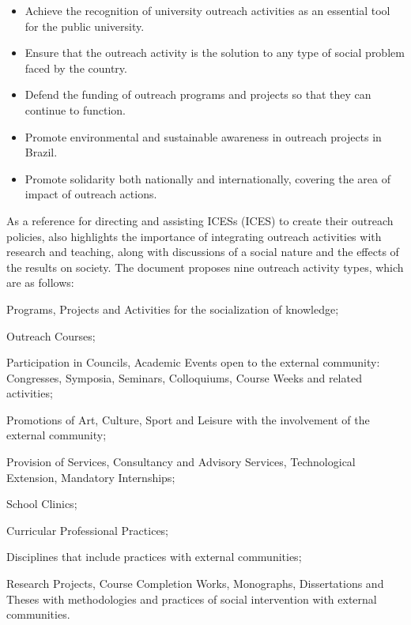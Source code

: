 \begin{itemize}
  \item Achieve the recognition of university outreach activities as an essential tool for the public university.
  \item Ensure that the outreach activity is the solution to any type of social problem faced by the country.
  \item Defend the funding of outreach programs and projects so that they can continue to function.
  \item Promote environmental and sustainable awareness in outreach projects in Brazil.
  \item Promote solidarity both nationally and internationally, covering the area of impact of outreach actions.
\end{itemize}

As a reference for directing and assisting \aclp{ICES} (\ac{ICES}) to create their outreach policies, \cite{referenciaisPolitica} also highlights the importance of integrating outreach activities with research and teaching, along with discussions of a social nature and the effects of the results on society. The document proposes nine outreach activity types, which are as follows:

\begin{inparaenum}[(1)]
  \item Programs, Projects and Activities for the socialization of knowledge;
  \item Outreach Courses;
  \item Participation in Councils, Academic Events open to the external community: Congresses, Symposia, Seminars, Colloquiums, Course Weeks and related activities;
  \item Promotions of Art, Culture, Sport and Leisure with the involvement of the external community;
  \item Provision of Services, Consultancy and Advisory Services, Technological Extension, Mandatory Internships;
  \item School Clinics;
  \item Curricular Professional Practices;
  \item Disciplines that include practices with external communities;
  \item Research Projects, Course Completion Works,
  Monographs, Dissertations and Theses with methodologies and practices of social intervention with external communities.
\end{inparaenum}

